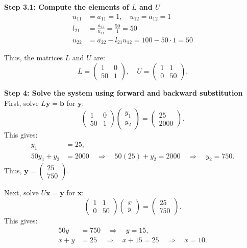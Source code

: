 \documentclass[journal]{IEEEtran}
\begin{document}
	\textbf{Step 3.1: Compute the elements of \(L\) and \(U\)}\\
	\begin{align}
		u_{11} &= a_{11} = 1, \quad u_{12} = a_{12} = 1 \\
		l_{21} &= \frac{a_{21}}{u_{11}} = \frac{50}{1} = 50 \\
		u_{22} &= a_{22} - l_{21}u_{12} = 100 - 50 \cdot 1 = 50
	\end{align}
	
	Thus, the matrices \(L\) and \(U\) are:
	\[
	L = \begin{pmatrix} 1 & 0 \\ 50 & 1 \end{pmatrix}, \quad U = \begin{pmatrix} 1 & 1 \\ 0 & 50 \end{pmatrix}.
	\]
	
	\textbf{Step 4: Solve the system using forward and backward substitution}\\
	First, solve \(L \mathbf{y} = \mathbf{b}\) for \(\mathbf{y}\):
	\[
	\begin{pmatrix} 1 & 0 \\ 50 & 1 \end{pmatrix} \begin{pmatrix} y_1 \\ y_2 \end{pmatrix} = \begin{pmatrix} 25 \\ 2000 \end{pmatrix}.
	\]
	This gives:
	\begin{align}
		y_1 &= 25, \\
		50y_1 + y_2 &= 2000 \quad \Rightarrow \quad 50(25) + y_2 = 2000 \quad \Rightarrow \quad y_2 = 750.
	\end{align}
	Thus, \(\mathbf{y} = \begin{pmatrix} 25 \\ 750 \end{pmatrix}\).
	
	Next, solve \(U \mathbf{x} = \mathbf{y}\) for \(\mathbf{x}\):
	\[
	\begin{pmatrix} 1 & 1 \\ 0 & 50 \end{pmatrix} \begin{pmatrix} x \\ y \end{pmatrix} = \begin{pmatrix} 25 \\ 750 \end{pmatrix}.
	\]
	This gives:
	\begin{align}
		50y &= 750 \quad \Rightarrow \quad y = 15, \\
		x + y &= 25 \quad \Rightarrow \quad x + 15 = 25 \quad \Rightarrow \quad x = 10.
	\end{align}
	
\end{document}
